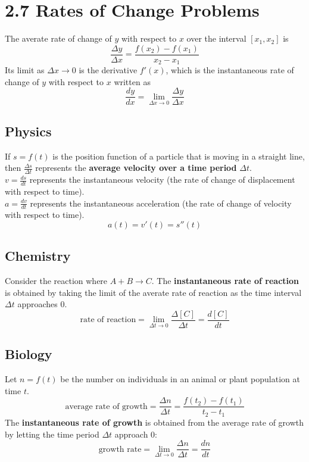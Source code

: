 %
%

\section*{2.7 Rates of Change Problems}

The averate rate of change of \(y\) with respect to \(x\) over the interval \([x_1, x_2]\) is
$$ \frac{\Delta y}{\Delta x} = \frac{f(x_2)-f(x_1)}{x_2-x_1} $$
Its limit as \(\Delta x \to 0\) is the derivative \(f'(x)\), which is the instantaneous rate of change of \(y\) with respect to \(x\) written as
$$ \frac{dy}{dx} = \lim_{\Delta x \to 0}\frac{\Delta y}{\Delta x} $$

\subsection*{Physics}

If \(s = f(t)\) is the position function of a particle that is moving in a straight line, then \(\frac{\Delta s}{\Delta t}\) represents the \textbf{average velocity over a time period} \(\Delta t\).\\
\(v=\frac{ds}{dt}\) represents the instantaneous velocity (the rate of change of displacement with respect to time).\\
\(a=\frac{dv}{dt}\) represents the instantaneous acceleration (the rate of change of velocity with respect to time).
$$ a(t)=v'(t)=s''(t) $$

\subsection*{Chemistry}

Consider the reaction where \(A + B \to C\). The \textbf{instantaneous rate of reaction} is obtained by taking the limit of the averate rate of reaction as the time interval \(\Delta t\) approaches 0.
$$ \text{rate of reaction} = \lim_{\Delta t \to 0}\frac{\Delta [C]}{\Delta t} = \frac{d[C]}{dt} $$

\subsection*{Biology}

Let \(n=f(t)\) be the number on individuals in an animal or plant population at time \(t\).
$$ \text{average rate of growth} = \frac{\Delta n}{\Delta t} = \frac{f(t_2)-f(t_1)}{t_2-t_1} $$
The \textbf{instantaneous rate of growth} is obtained from the average rate of growth by letting the time period \(\Delta t\) approach 0:
$$ \text{growth rate} = \lim_{\Delta t \to 0}\frac{\Delta n}{\Delta t} = \frac{dn}{dt} $$
